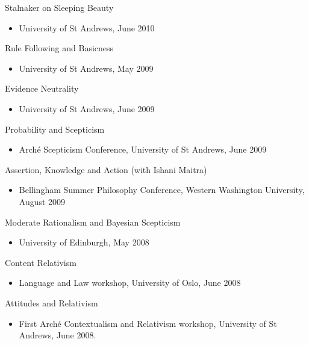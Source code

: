 \documentclass[
  10pt,
  letterpaper,
  DIV=11,
  numbers=noendperiod,
  twoside]{scrartcl}
\providecommand{\tightlist}{%
  \setlength{\itemsep}{0pt}\setlength{\parskip}{0pt}}
\begin{document}
Stalnaker on Sleeping Beauty

\begin{itemize}
\tightlist
\item
  University of St Andrews, June 2010
\end{itemize}

Rule Following and Basicness

\begin{itemize}
\tightlist
\item
  University of St Andrews, May 2009
\end{itemize}

Evidence Neutrality

\begin{itemize}
\tightlist
\item
  University of St Andrews, June 2009
\end{itemize}

Probability and Scepticism

\begin{itemize}
\tightlist
\item
  Arché Scepticism Conference, University of St Andrews, June 2009
\end{itemize}

Assertion, Knowledge and Action (with Ishani Maitra)

\begin{itemize}
\tightlist
\item
  Bellingham Summer Philosophy Conference, Western Washington
  University, August 2009
\end{itemize}

Moderate Rationalism and Bayesian Scepticism

\begin{itemize}
\tightlist
\item
  University of Edinburgh, May 2008
\end{itemize}

Content Relativism

\begin{itemize}
\tightlist
\item
  Language and Law workshop, University of Oslo, June 2008
\end{itemize}

Attitudes and Relativism

\begin{itemize}
\tightlist
\item
  First Arché Contextualism and Relativism workshop, University of St
  Andrews, June 2008.
\end{itemize}
\end{document}
